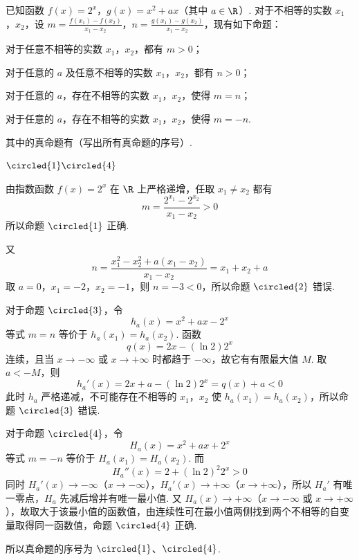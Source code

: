 \begin{problem}
已知函数 \(f(x) = 2^x\)，\(g(x) = x^2 + ax\)（其中 \(a \in \R\)）. 对于不相等的实数 \(x_1\)，\(x_2\)，设 \(m = \frac{f(x_1) - f(x_2)}{x_1 - x_2}\)，\(n = \frac{g(x_1) - g(x_2)}{x_1 - x_2}\)，现有如下命题：

\begin{circlelist}
\item 对于任意不相等的实数 \(x_1\)，\(x_2\)，都有 \(m > 0\)；
\item 对于任意的 \(a\) 及任意不相等的实数 \(x_1\)，\(x_2\)，都有 \(n > 0\)；
\item 对于任意的 \(a\)，存在不相等的实数 \(x_1\)，\(x_2\)，使得 \(m = n\)；
\item 对于任意的 \(a\)，存在不相等的实数 \(x_1\)，\(x_2\)，使得 \(m = -n\).
\end{circlelist}

其中的真命题有\fillinblank{}（写出所有真命题的序号）.
\end{problem}

\begin{answer}
\(\circled{1}\circled{4}\)
\end{answer}

\begin{solution}
由指数函数 \(f(x)=2^x\) 在 \(\R\) 上严格递增，任取 \(x_1\neq x_2\) 都有
\[
m=\frac{2^{x_1}-2^{x_2}}{x_1-x_2}>0
\]
所以命题 \(\circled{1}\) 正确.

又
\[
n=\frac{x_1^2-x_2^2+a(x_1-x_2)}{x_1-x_2}=x_1+x_2+a
\]
取 \(a=0\)，\(x_1=-2\)，\(x_2=-1\)，则 \(n=-3<0\)，所以命题 \(\circled{2}\) 错误.

对于命题 \(\circled{3}\)，令
\[
h_a(x)=x^2+ax-2^x
\]
等式 \(m=n\) 等价于 \(h_a(x_1)=h_a(x_2)\). 函数
\[
q(x)=2x-(\ln2)2^x
\]
连续，且当 \(x\to-\infty\) 或 \(x\to+\infty\) 时都趋于 \(-\infty\)，故它有有限最大值 \(M\). 取 \(a<-M\)，则
\[
h_a'(x)=2x+a-(\ln2)2^x=q(x)+a<0
\]
此时 \(h_a\) 严格递减，不可能存在不相等的 \(x_1\)，\(x_2\) 使 \(h_a(x_1)=h_a(x_2)\)，所以命题 \(\circled{3}\) 错误.

对于命题 \(\circled{4}\)，令
\[
H_a(x)=x^2+ax+2^x
\]
等式 \(m=-n\) 等价于 \(H_a(x_1)=H_a(x_2)\). 而
\[
H_a''(x)=2+(\ln2)^2 2^x>0
\]
同时 \(H_a'(x)\to-\infty\)（\(x\to-\infty\)），\(H_a'(x)\to+\infty\)（\(x\to+\infty\)），所以 \(H_a'\) 有唯一零点，\(H_a\) 先减后增并有唯一最小值. 又 \(H_a(x)\to+\infty\)（\(x\to-\infty\) 或 \(x\to+\infty\)），故取大于该最小值的函数值，由连续性可在最小值两侧找到两个不相等的自变量取得同一函数值，命题 \(\circled{4}\) 正确.

所以真命题的序号为 \(\circled{1}\)、\(\circled{4}\).
\end{solution}

